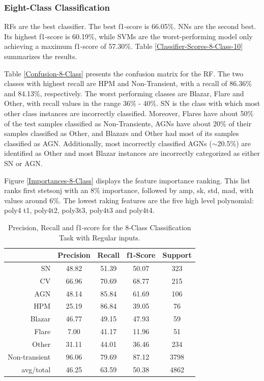 \documentclass[a4paper,fleqn,usenatbib]{mnras}
\begin{document}
\subsubsection{Eight-Class Classification}


RFs are the best classifier. 
The best f1-score is 66.05\%. 
NNs are the second best. 
Its highest f1-score is 60.19\%, while SVMs are the worst-performing
model only achieving a maximum f1-score of 57.30\%.
Table \ref{Classifier-Scores-8-Class-10} summarizes the results. 


Table \ref{Confusion-8-Class} presents the confusion matrix for the RF.
The two classes with highest recall are HPM and Non-Transient, with a
recall of 86.36\% and 84.13\%, respectively. 
The worst performing classes are Blazar, Flare and Other, with recall
values in the range 36\% - 40\%. 
SN is the class with which most other class instances are
incorrectly classified. 
Moreover, Flares have about 50\% of the test samples classified as
Non-Transients, AGNs have about 20\% of their 
samples classified as Other, and Blazars and Other had most of  its
samples classified as AGN. 
Additionally, most incorrectly classified AGNs ($\sim$20.5\%) are
identified as Other and most Blazar instances are
incorrectly categorized as either SN or AGN. 


Figure \ref{Importances-8-Class} displays the feature importance ranking.
This list ranks first stetson\textunderscore j with an 8\% importance,
followed by amp, sk, std, mad, with values around 6\%. 
The lowest raking features are the five high level polynomial: poly4\textunderscore
t1,  poly4\textunderscore t2, poly3\textunderscore t3,
poly4\textunderscore t3 and poly4\textunderscore t4. 


\begin{table}
\centering
\begin{tabular}{|r|c|c|c|c|}
\hline
\multicolumn{1}{|l|}{} & Precision & Recall & f1-Score & Support \\ \hline \hline
SN            &   48.82 &   51.39  &  50.07  &  323 \\ \hline
CV            &   66.96 &   70.69  &  68.77  &  215 \\ \hline
AGN           &   48.14 &   85.84  &  61.69  &  106 \\ \hline
HPM           &   25.19 &   86.84  &  39.05  &   76 \\ \hline
Blazar        &   46.77 &   49.15  &  47.93  &   59 \\ \hline
Flare         &    7.00 &   41.17  &  11.96  &   51 \\ \hline
Other         &   31.11 &   44.01  &  36.46  &  234 \\ \hline
Non-transient &   96.06 &   79.69  &  87.12  & 3798 \\ \hline
avg/total     &   46.25 &   63.59  &  50.38  & 4862 \\ \hline
\end{tabular}
\caption{Precision, Recall and f1-score for the 8-Class Classification Task with Regular inputs.}
\label{Overall-Scores-8-Class-Regular}
\end{table}
\end{document}
